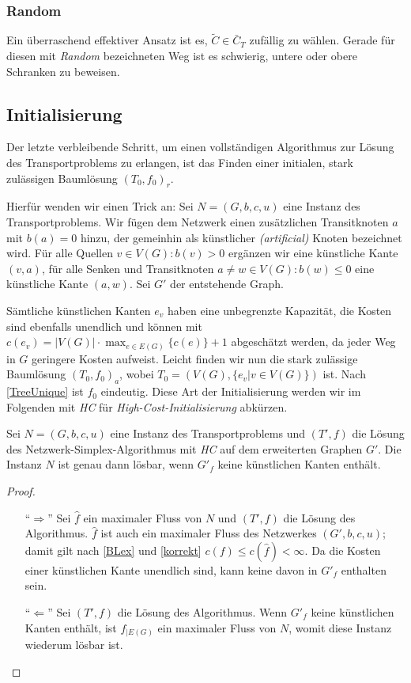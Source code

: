 \subsubsection{Random}
Ein überraschend effektiver Ansatz ist es, $\tilde{C}\in \bar{C}_T$ zufällig zu wählen. Gerade für diesen mit \emph{Random} bezeichneten Weg ist es schwierig, untere oder obere Schranken zu beweisen.

\subsection{Initialisierung} \label{ch:init}
Der letzte verbleibende Schritt, um einen vollständigen Algorithmus zur Lösung des Transportproblems zu erlangen, ist das Finden einer initialen, stark zulässigen Baumlösung $(T_0,f_0)_r$.

Hierfür wenden wir einen Trick an: Sei $N=(G,b,c,u)$ eine Instanz des Transportproblems. Wir fügen dem Netzwerk einen zusätzlichen Transitknoten $a$ mit $b(a)=0$ hinzu, der gemeinhin als künstlicher \textit{(artificial)} Knoten bezeichnet wird. Für alle Quellen $v\in V(G):b(v)>0$ ergänzen wir eine künstliche Kante $(v,a)$, für alle Senken und Transitknoten $a\neq w\in V(G):b(w)\leq0$ eine künstliche Kante $(a,w)$. Sei $G'$ der entstehende Graph.

Sämtliche künstlichen Kanten $e_v$ haben eine unbegrenzte Kapazität, die Kosten sind ebenfalls unendlich und können mit $c(e_v)=|V(G)|\cdot\max_{e\in E(G)}\{c(e)\}+1$ abgeschätzt werden, da jeder Weg in $G$ geringere Kosten aufweist. Leicht finden wir nun die stark zulässige Baumlösung $(T_0,f_0)_a$, wobei $T_0=(V(G),\{e_v|v\in V(G)\})$ ist. Nach \cref{TreeUnique} ist $f_0$ eindeutig. Diese Art der Initialisierung werden wir im Folgenden mit \emph{HC} für \emph{High-Cost-Initialisierung} abkürzen.

\begin{lem}Sei $N=(G,b,c,u)$ eine Instanz des Transportproblems und $(T',f)$ die Lösung des Netzwerk-Simplex-Algorithmus mit \emph{HC} auf dem erweiterten Graphen $G'$. Die Instanz $N$ ist genau dann lösbar, wenn $G'_f$ keine künstlichen Kanten enthält.\end{lem}
\begin{proof}\label{solvable}\mbox{}
\begin{itemize}[topsep=0pt]
	\item[\enquote{$\Rightarrow$}] Sei $\hat{f}$ ein maximaler Fluss von $N$ und $(T',f)$ die Lösung des Algorithmus. $\hat{f}$ ist auch ein maximaler Fluss des Netzwerkes $(G',b,c,u)$; damit gilt nach \cref{BLex} und \cref{korrekt} $c(f)\leq c(\hat{f})<\infty$. Da die Kosten einer künstlichen Kante unendlich sind, kann keine davon in $G'_f$ enthalten sein.
	
	\item[\enquote{$\Leftarrow$}] Sei $(T',f)$ die Lösung des Algorithmus. Wenn $G'_f$ keine künstlichen Kanten enthält, ist $f_{|E(G)}$ ein maximaler Fluss von $N$, womit diese Instanz wiederum lösbar ist.\qedhere
\end{itemize}
\end{proof}

